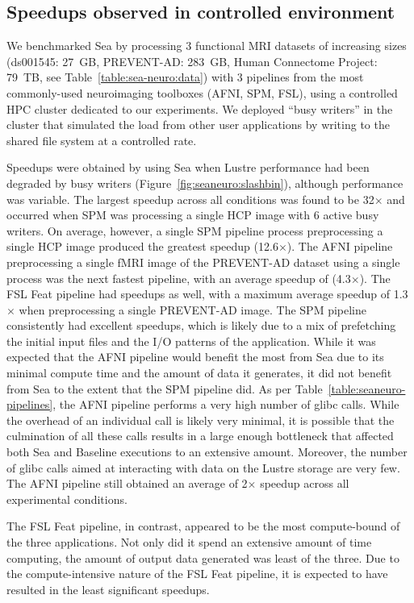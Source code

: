 \documentclass[fleqn,10pt]{wlscirep}
\begin{document}
\subsection{Speedups observed in controlled environment}

We benchmarked Sea by processing 3 functional MRI datasets of increasing sizes
(ds001545: 27~GB, PREVENT-AD: 283~GB, Human Connectome Project: 79~TB, see
Table~\ref{table:sea-neuro:data}) with 3 pipelines 
from the most commonly-used neuroimaging toolboxes (AFNI, SPM, FSL), using a controlled HPC cluster 
dedicated to our experiments. We deployed ``busy writers'' in the cluster
that simulated the load from other user applications by writing to the shared file system at a controlled rate.

Speedups were obtained by using Sea when Lustre
performance had been degraded by busy writers (Figure~\ref{fig:seaneuro:slashbin}),
although performance was variable. The largest speedup across all conditions
was found to be 32$\times$ and occurred when SPM was processing a single
HCP image with 6 active busy writers.
On average, however, a single SPM pipeline
process preprocessing a single HCP image produced the greatest speedup
(12.6$\times$). The AFNI pipeline preprocessing a single fMRI image of the PREVENT-AD dataset
using a single process was the next fastest pipeline, with an average speedup of
(4.3$\times$). The FSL Feat pipeline had speedups as well, with a maximum average speedup of
1.3$\times$ when preprocessing a single PREVENT-AD image. The SPM pipeline consistently had
excellent speedups, which is likely due to a mix of prefetching the initial
input files and the I/O patterns of the application. While it was expected that the
AFNI pipeline would benefit the most from Sea due to its
minimal compute time and the amount of data it generates, it did not benefit
from Sea to the extent that the SPM pipeline did. As per Table~\ref{table:seaneuro-pipelines}, the
AFNI pipeline performs a very high number of glibc calls. While the overhead of an
individual call is likely very minimal, it is possible that the culmination of
all these calls results in a large enough bottleneck that affected both Sea and
Baseline executions to an extensive amount. Moreover, the number of glibc calls
aimed at interacting with data on the Lustre storage are very few. The AFNI pipeline still
obtained an average of 2$\times$ speedup across all experimental conditions.

The FSL Feat pipeline, in contrast, appeared to be the most compute-bound of the three
applications. Not only did it spend an extensive amount of time computing, the
amount of output data generated was least of the three. Due to the
compute-intensive nature of the FSL Feat pipeline, it is expected to have resulted in the
least significant speedups.
\end{document}
